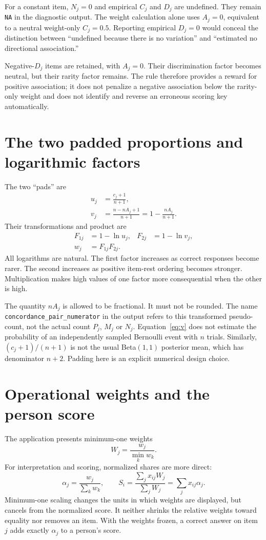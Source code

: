 \documentclass[11pt,a4paper,oneside,headings=normal,parskip=half]{scrreprt}
\newcommand{\code}[1]{\nolinkurl{#1}}
\begin{document}
For a constant item, $N_j=0$ and empirical $C_j$ and $D_j$ are undefined. They remain \code{NA} in the diagnostic output. The weight calculation alone uses $A_j=0$, equivalent to a neutral weight-only $C_j=0.5$. Reporting empirical $D_j=0$ would conceal the distinction between ``undefined because there is no variation'' and ``estimated no directional association.''

Negative-$D_j$ items are retained, with $A_j=0$. Their discrimination factor becomes neutral, but their rarity factor remains. The rule therefore provides a reward for positive association; it does not penalize a negative association below the rarity-only weight and does not identify and reverse an erroneous scoring key automatically.

\section{The two padded proportions and logarithmic factors}
The two ``pads'' are
\begin{align}
 u_j&=\frac{c_j+1}{n+1},\label{eq:u}\\
 v_j&=\frac{n-nA_j+1}{n+1}
     =1-\frac{nA_j}{n+1}.\label{eq:v}
\end{align}
Their transformations and product are
\begin{align}
 F_{1j}&=1-\ln u_j, & F_{2j}&=1-\ln v_j,\\
 w_j&=F_{1j}F_{2j}.\label{eq:w}
\end{align}
All logarithms are natural. The first factor increases as correct responses become rarer. The second increases as positive item-rest ordering becomes stronger. Multiplication makes high values of one factor more consequential when the other is high.

The quantity $nA_j$ is allowed to be fractional. It must not be rounded. The name \code{concordance_pair_numerator} in the output refers to this transformed pseudo-count, not the actual count $P_j$, $M_j$ or $N_j$. Equation~\eqref{eq:v} does not estimate the probability of an independently sampled Bernoulli event with $n$ trials. Similarly, $(c_j+1)/(n+1)$ is not the usual Beta$(1,1)$ posterior mean, which has denominator $n+2$. Padding here is an explicit numerical design choice.

\section{Operational weights and the person score}
The application presents minimum-one weights
\begin{equation}
 W_j=\frac{w_j}{\min_k w_k}.
\end{equation}
For interpretation and scoring, normalized shares are more direct:
\begin{equation}
 \alpha_j=\frac{w_j}{\sum_k w_k},\qquad
 S_i=\frac{\sum_jx_{ij}W_j}{\sum_jW_j}
    =\sum_jx_{ij}\alpha_j.\label{eq:S}
\end{equation}
Minimum-one scaling changes the units in which weights are displayed, but cancels from the normalized score. It neither shrinks the relative weights toward equality nor removes an item. With the weights frozen, a correct answer on item $j$ adds exactly $\alpha_j$ to a person's score.
\end{document}
